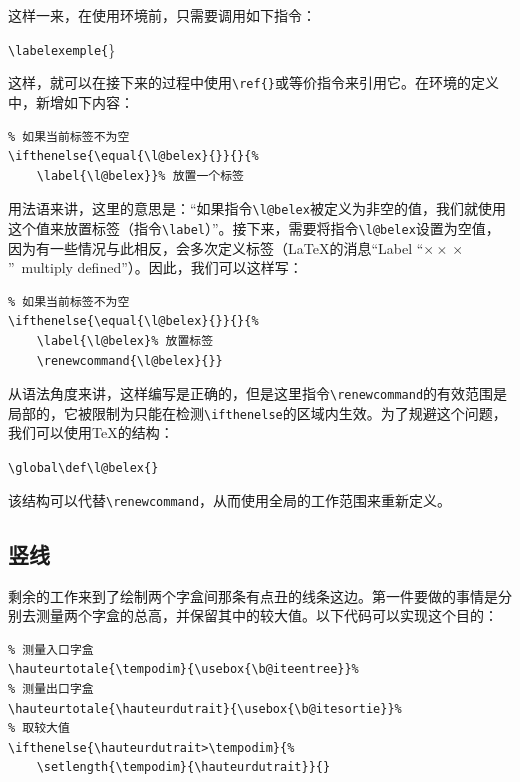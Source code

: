 这样一来，在使用环境前，只需要调用如下指令：

\begin{dmd}
\verb|\labelexemple{|\}
\end{dmd}

这样，就可以在接下来的过程中使用\verb|\ref{|\verb+}+或等价指令来引用它。在环境的定义中，新增如下内容：

\begin{dmd}
\begin{verbatim}
% 如果当前标签不为空
\ifthenelse{\equal{\l@belex}{}}{}{%
    \label{\l@belex}}% 放置一个标签
\end{verbatim}
\end{dmd}

用法语来讲，这里的意思是：“如果指令\verb|\l@belex|被定义为非空的值，我们就使用这个值来放置标签（指令\verb|\label|）”。接下来，需要将指令\verb|\l@belex|设置为空值，因为有一些情况与此相反，会多次定义标签（\LaTeX 的消息“Label ``$\times\!\times\!\times$''\ multiply defined”）。因此，我们可以这样写：

\begin{dmd}
\begin{verbatim}
% 如果当前标签不为空 
\ifthenelse{\equal{\l@belex}{}}{}{%
    \label{\l@belex}% 放置标签
    \renewcommand{\l@belex}{}}
\end{verbatim}
\end{dmd}

从语法角度来讲，这样编写是正确的，但是这里指令\verb|\renewcommand|的有效范围是局部的，它被限制为只能在检测\verb|\ifthenelse|的区域内生效。为了规避这个问题，我们可以使用\TeX 的结构：

\begin{dmd}
\verb|\global\def\l@belex{}|
\end{dmd}

该结构可以代替\verb|\renewcommand|，从而使用全局的工作范围来重新定义。

\subsection{竖线}

剩余的工作来到了绘制两个字盒间那条有点丑的线条这边。第一件要做的事情是分别去测量两个字盒的总高，并保留其中的较大值。以下代码可以实现这个目的：

\begin{dmd}
\begin{verbatim}
% 测量入口字盒
\hauteurtotale{\tempodim}{\usebox{\b@iteentree}}%
% 测量出口字盒
\hauteurtotale{\hauteurdutrait}{\usebox{\b@itesortie}}% 
% 取较大值
\ifthenelse{\hauteurdutrait>\tempodim}{%
    \setlength{\tempodim}{\hauteurdutrait}}{}
\end{verbatim}
\end{dmd}

